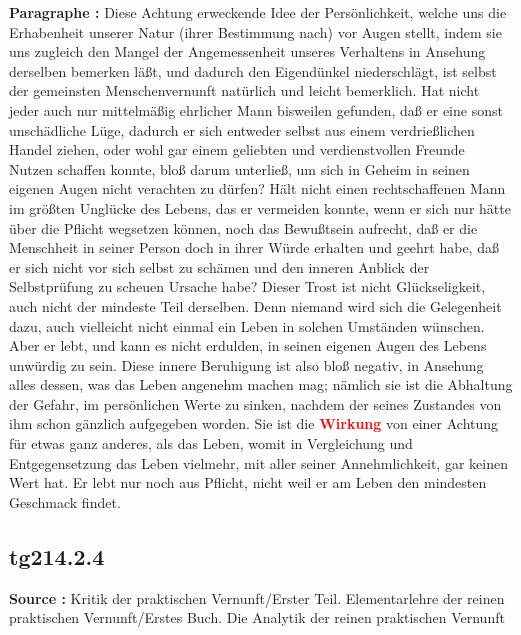 \documentclass[a4paper,12pt,twoside]{book}
\newcommand{\match}[1]{\textcolor{red}{\textbf{#1}}}
\begin{document}
	\noindent\textbf{Paragraphe : }
	Diese Achtung erweckende Idee der Persönlichkeit, welche uns die Erhabenheit unserer Natur (ihrer Bestimmung nach) vor Augen stellt, indem sie uns zugleich den Mangel der Angemessenheit unseres Verhaltens in Ansehung derselben bemerken läßt, und dadurch den Eigendünkel niederschlägt, ist selbst der gemeinsten Menschenvernunft natürlich und leicht bemerklich. Hat nicht jeder auch nur mittelmäßig ehrlicher Mann bisweilen gefunden, daß er eine sonst unschädliche Lüge, dadurch er sich entweder selbst aus einem verdrießlichen Handel ziehen, oder wohl gar einem geliebten und verdienstvollen Freunde Nutzen schaffen konnte, bloß darum unterließ, um sich in Geheim in seinen eigenen Augen nicht verachten zu dürfen? Hält nicht einen rechtschaffenen Mann im größten Unglücke des Lebens, das er vermeiden konnte, wenn er sich nur hätte über die Pflicht wegsetzen können, noch das Bewußtsein aufrecht, daß er die Menschheit in seiner Person doch in ihrer Würde erhalten und geehrt habe, daß er sich nicht vor sich selbst zu schämen und den inneren Anblick der Selbstprüfung zu scheuen Ursache habe? Dieser Trost ist nicht Glückseligkeit, auch nicht der mindeste Teil derselben. Denn niemand wird sich die Gelegenheit dazu, auch vielleicht nicht einmal ein Leben in solchen Umständen wünschen. Aber er lebt, und kann es nicht erdulden, in seinen eigenen Augen des Lebens unwürdig zu sein. Diese innere Beruhigung ist also bloß negativ, in Ansehung alles dessen, was das Leben angenehm machen mag; nämlich sie ist die Abhaltung der Gefahr, im persönlichen Werte zu sinken, nachdem der seines Zustandes von ihm schon gänzlich aufgegeben worden. Sie ist die \match{Wirkung} von einer Achtung für etwas ganz anderes, als das Leben, womit in Vergleichung und Entgegensetzung das Leben vielmehr, mit aller seiner Annehmlichkeit, gar keinen Wert hat. Er lebt nur noch aus Pflicht, nicht weil er am Leben den mindesten Geschmack findet. 
	
	\subsection*{tg214.2.4} 
	\textbf{Source : }Kritik der praktischen Vernunft/Erster Teil. Elementarlehre der reinen praktischen Vernunft/Erstes Buch. Die Analytik der reinen praktischen Vernunft\\  
	
\end{document}
